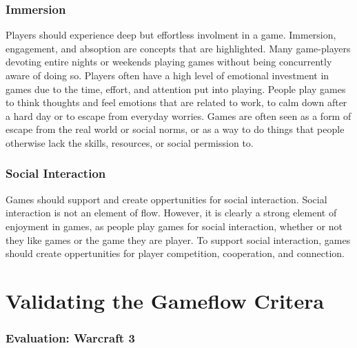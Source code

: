     \subsubsection*{Immersion}
    Players should experience deep but effortless involment in a game. Immersion, engagement, and absoption are concepts that are highlighted. Many game-players devoting entire nights or weekends playing games without being concurrently aware of doing so. Players often have a high level of emotional investment in games due to the time, effort, and attention put into playing. People play games to think thoughts and feel emotions that are related to work, to calm down after a hard day or to escape from everyday worries. Games are often seen as a form of escape from the real world or social norms, or as a way to do things that people otherwise lack the skills, resources, or social permission to. 

    \subsubsection*{Social Interaction}
    Games should support and create oppertunities for social interaction. Social interaction is not an element of flow. However, it is clearly a strong element of enjoyment in games, as people play games for social interaction, whether or not they like games or the game they are player. To support social interaction, games should create oppertunities for player competition, cooperation, and connection. 


  \section*{Validating the Gameflow Critera}


    \subsubsection*{Evaluation: Warcraft 3}

